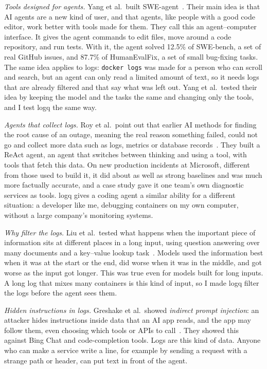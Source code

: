\documentclass[10pt,conference]{IEEEtran}
\newcommand{\cmd}[1]{\texttt{#1}}
\begin{document}
\emph{Tools designed for agents.} Yang et al.\ built SWE-agent~\cite{yang2024sweagent}. Their main idea is that AI agents are a new kind of user, and that agents, like people with a good code editor, work better with tools made for them. They call this an agent--computer interface. It gives the agent commands to edit files, move around a code repository, and run tests. With it, the agent solved 12.5\% of SWE-bench, a set of real GitHub issues, and 87.7\% of HumanEvalFix, a set of small bug-fixing tasks. The same idea applies to logs: \cmd{docker logs} was made for a person who can scroll and search, but an agent can only read a limited amount of text, so it needs logs that are already filtered and that say what was left out. Yang et al.\ tested their idea by keeping the model and the tasks the same and changing only the tools, and I test logq the same way.

\emph{Agents that collect logs.} Roy et al.\ point out that earlier AI methods for finding the root cause of an outage, meaning the real reason something failed, could not go and collect more data such as logs, metrics or database records~\cite{roy2024rcaagents}. They built a ReAct agent, an agent that switches between thinking and using a tool, with tools that fetch this data. On new production incidents at Microsoft, different from those used to build it, it did about as well as strong baselines and was much more factually accurate, and a case study gave it one team's own diagnostic services as tools. logq gives a coding agent a similar ability for a different situation: a developer like me, debugging containers on my own computer, without a large company's monitoring systems.

\emph{Why filter the logs.} Liu et al.\ tested what happens when the important piece of information sits at different places in a long input, using question answering over many documents and a key--value lookup task~\cite{liu2024lostmiddle}. Models used the information best when it was at the start or the end, did worse when it was in the middle, and got worse as the input got longer. This was true even for models built for long inputs. A long log that mixes many containers is this kind of input, so I made logq filter the logs before the agent sees them.

\emph{Hidden instructions in logs.} Greshake et al.\ showed \emph{indirect prompt injection}: an attacker hides instructions inside data that an AI app reads, and the app may follow them, even choosing which tools or APIs to call~\cite{greshake2023injection}. They showed this against Bing Chat and code-completion tools. Logs are this kind of data. Anyone who can make a service write a line, for example by sending a request with a strange path or header, can put text in front of the agent.
\end{document}
